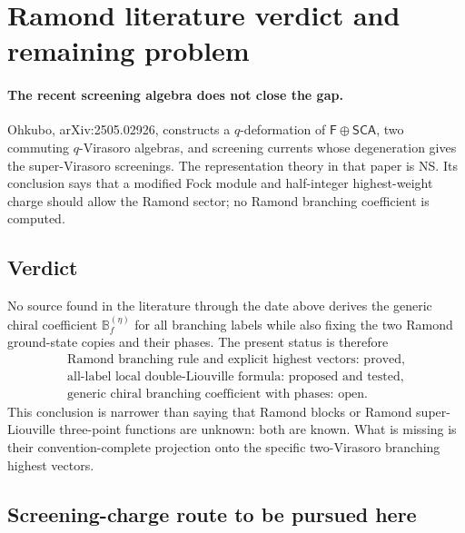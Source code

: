 \documentclass[11pt]{article}
\newcommand{\Ff}{\mathsf F}
\newcommand{\SCA}{\mathsf{SCA}}
\begin{document}
\section{Ramond literature verdict and remaining problem}

\paragraph{The recent screening algebra does not close the gap.}
Ohkubo, arXiv:2505.02926, constructs a \(q\)-deformation of
\(\Ff\oplus\SCA\), two commuting \(q\)-Virasoro algebras, and screening
currents whose degeneration gives the super-Virasoro screenings.  The
representation theory in that paper is NS.  Its conclusion says that a
modified Fock module and half-integer highest-weight charge should allow the
Ramond sector; no Ramond branching coefficient is computed.

\subsection{Verdict}

No source found in the literature through the date above derives the generic
chiral coefficient \(\mathbb B_f^{(\eta)}\) for all branching labels while
also fixing the two Ramond ground-state copies and their phases.  The present
status is therefore
\begin{equation}
 \boxed{
 \begin{gathered}
 \text{Ramond branching rule and explicit highest vectors: proved,}\\
 \text{all-label local double-Liouville formula: proposed and tested,}\\
 \text{generic chiral branching coefficient with phases: open.}
 \end{gathered}}
 \label{eq:ramond-literature-verdict}
\end{equation}
This conclusion is narrower than saying that Ramond blocks or Ramond
super-Liouville three-point functions are unknown: both are known.  What is
missing is their convention-complete projection onto the specific
two-Virasoro branching highest vectors.

\subsection{Screening-charge route to be pursued here}
\end{document}
